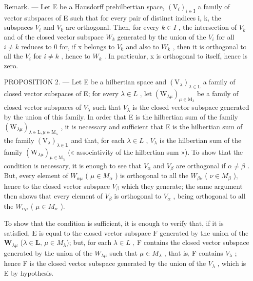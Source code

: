 Remark. --- Let E be a Hausdorff prehilbertian space, \((\mathrm{V}_{i})_{i\in\mathrm{I}}\) a family of vector subspaces of E such that for every pair of distinct indices i, k, the subspaces \(V_{i}\) and \(V_{k}\) are orthogonal. Then, for every \(k\in I\) , the intersection of \(V_{k}\) and of the closed vector subspace \(W_{k}\) generated by the union of the \(V_{i}\) for all \(i\neq k\) reduces to 0 for, if x belongs to \(V_{k}\) and also to \(W_{k}\) , then it is orthogonal to all the \(V_{i}\) for \(i\neq k\) , hence to \(W_{k}\) . In particular, x is orthogonal to itself, hence is zero.

PROPOSITION 2. --- Let E be a hilbertian space and \((\mathrm{V}_{\lambda})_{\lambda\in\mathrm{L}}\) a family of closed vector subspaces of E; for every \(\lambda\in L\) , let \((\mathrm{W}_{\lambda\mu})_{\mu\in\mathrm{M}_{\lambda}}\) be a family of closed vector subspaces of \(V_{\lambda}\) such that \(V_{\lambda}\) is the closed vector subspace generated by the union of this family. In order that E is the hilbertian sum of the family \((\mathrm{W}_{\lambda\mu})_{\lambda\in\mathrm{L},\mu\in\mathrm{M}_{\lambda}}\) , it is necessary and sufficient that E is the hilbertian sum of the family \((\mathrm{V}_{\lambda})_{\lambda\in\mathrm{L}}\) and that, for each \(\lambda\in L\) , \(V_{\lambda}\) is the hilbertian sum of the family \((\mathrm{W}_{\lambda\mu})_{\mu\in\mathrm{M}_{\lambda}}\) (« associativity of the hilbertian sum »). To show that the condition is necessary, it is enough to see that \(V_{\alpha}\) and \(V_{\beta}\) are orthogonal if \(\alpha\neq\beta\) . But, every element of \(W_{\alpha\mu}\) ( \(\mu\in M_{\alpha}\) ) is orthogonal to all the \(W_{\beta\nu}\) ( \(\nu\in M_{\beta}\) ), hence to the closed vector subspace \(V_{\beta}\) which they generate; the same argument then shows that every element of \(V_{\beta}\) is orthogonal to \(V_{\alpha}\) , being orthogonal to all the \(W_{\alpha\mu}\) ( \(\mu\in M_{\alpha}\) ).

To show that the condition is sufficient, it is enough to verify that, if it is satisfied, \(\mathrm{E}\) is equal to the closed vector subspace \(\mathrm{F}\) generated by the union of the \(\mathbf{W}_{\lambda \mu}\) (\(\lambda \in \mathbf{L}\), \(\mu\in M_{\lambda}\)); but, for each \(\lambda\in L\) , F contains the closed vector subspace generated by the union of the \(W_{\lambda\mu}\) such that \(\mu\in M_{\lambda}\) , that is, F contains \(V_{\lambda}\) ; hence F is the closed vector subspace generated by the union of the \(V_{\lambda}\) , which is E by hypothesis.


